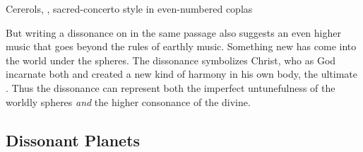 
\begin{musicexample}
    \caption{Cererols, , sacred-concerto style in
    even-numbered coplas}
    \label{mus:Cererols-Suspended-concierto}
\end{musicexample}

But writing a dissonance on  in the same passage also
suggests an even higher music that goes beyond the rules of earthly music.
Something new has come into the world under the spheres.
The dissonance symbolizes Christ, who as God incarnate both  and created a new kind of harmony in his own
body, the ultimate .
Thus the dissonance can represent both the imperfect untunefulness of
the worldly spheres \emph{and} the higher consonance of the divine.


\subsection{Dissonant Planets}

